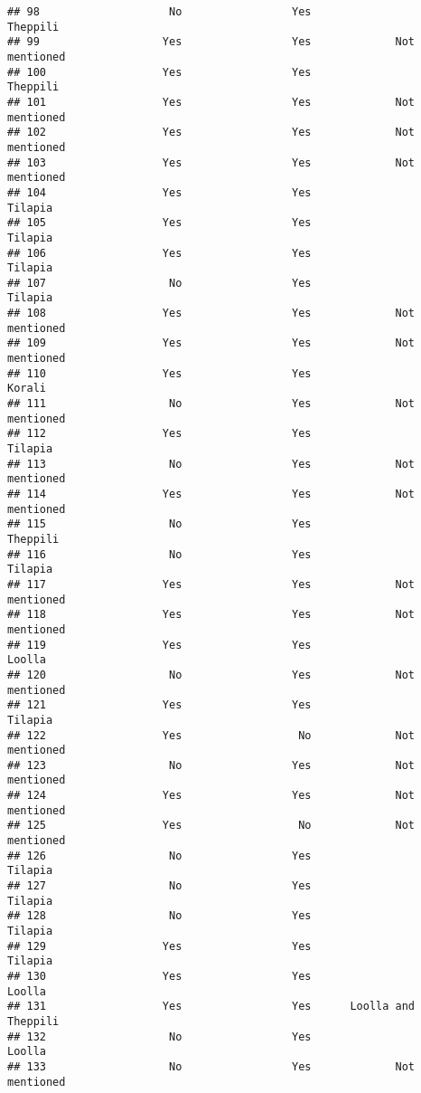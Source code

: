 \documentclass[
]{article}
\begin{document}
\begin{verbatim}
## 98                    No                 Yes                 Theppili 
## 99                   Yes                 Yes             Not mentioned
## 100                  Yes                 Yes                 Theppili 
## 101                  Yes                 Yes             Not mentioned
## 102                  Yes                 Yes             Not mentioned
## 103                  Yes                 Yes             Not mentioned
## 104                  Yes                 Yes                  Tilapia 
## 105                  Yes                 Yes                  Tilapia 
## 106                  Yes                 Yes                  Tilapia 
## 107                   No                 Yes                  Tilapia 
## 108                  Yes                 Yes             Not mentioned
## 109                  Yes                 Yes             Not mentioned
## 110                  Yes                 Yes                    Korali
## 111                   No                 Yes             Not mentioned
## 112                  Yes                 Yes                  Tilapia 
## 113                   No                 Yes             Not mentioned
## 114                  Yes                 Yes             Not mentioned
## 115                   No                 Yes                 Theppili 
## 116                   No                 Yes                  Tilapia 
## 117                  Yes                 Yes             Not mentioned
## 118                  Yes                 Yes             Not mentioned
## 119                  Yes                 Yes                   Loolla 
## 120                   No                 Yes             Not mentioned
## 121                  Yes                 Yes                  Tilapia 
## 122                  Yes                  No             Not mentioned
## 123                   No                 Yes             Not mentioned
## 124                  Yes                 Yes             Not mentioned
## 125                  Yes                  No             Not mentioned
## 126                   No                 Yes                  Tilapia 
## 127                   No                 Yes                  Tilapia 
## 128                   No                 Yes                  Tilapia 
## 129                  Yes                 Yes                  Tilapia 
## 130                  Yes                 Yes                   Loolla 
## 131                  Yes                 Yes      Loolla and Theppili 
## 132                   No                 Yes                   Loolla 
## 133                   No                 Yes             Not mentioned

\end{verbatim}
\end{document}
